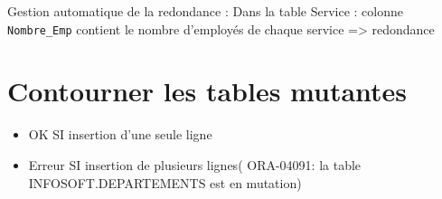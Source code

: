 \documentclass[10pt]{beamer}
\begin{document}
\begin{frame}{\secname}
    
\end{frame}

\begin{frame}[allowframebreaks]{\secname}
    
\end{frame}

\begin{frame}[allowframebreaks]{\secname}
    Gestion automatique de la redondance :
    Dans la table Service : colonne \lstinline[language=plsql]!Nombre_Emp! contient le nombre d'employés de chaque service => redondance
\end{frame}

\begin{frame}[allowframebreaks]{\secname}
    
\end{frame}

\begin{frame}{\secname}
    
\end{frame}

\begin{frame}[allowframebreaks]{\secname}
    
\end{frame}


\section{Contourner les tables mutantes}
\begin{frame}[allowframebreaks]{\secname}
    
    \begin{itemize}
        \item OK  SI insertion d’une seule ligne
        \item Erreur SI insertion de plusieurs lignes( ORA-04091: la table INFOSOFT.DEPARTEMENTS est en mutation)
    \end{itemize}
\end{frame}
\end{document}
